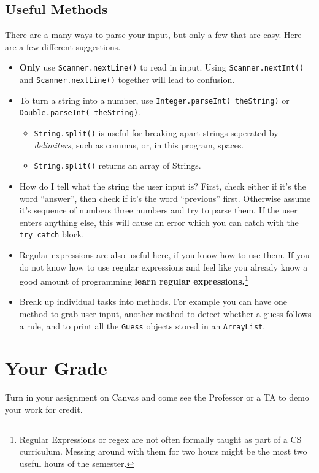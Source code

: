 \documentclass[10pt,letterpaper]{article}
\begin{document}
	\subsection{Useful Methods}
	There are a many ways to parse your input, but only a few that are easy.
	Here are a few different suggestions.  
	\begin{itemize}
		\item \textbf{Only} use \texttt{Scanner.nextLine()} to read in input.  Using \texttt{Scanner.nextInt()} and \texttt{Scanner.nextLine()} together will lead to confusion. 
		\item  To turn a string into a number, use \texttt{Integer.parseInt( theString)} or \texttt{Double.parseInt( theString)}.
		\begin{itemize}	
			\item \texttt{String.split()} is useful for breaking apart strings seperated by \textit{delimiters}, such as commas, or, in this program, spaces.
			\item \texttt{String.split()} returns an array of Strings.
		\end{itemize}
		\item How do I tell what the string the user input is? First, check either if it's the word ``answer'', then check if it's the word ``previous'' first.  Otherwise assume it's sequence of numbers three numbers and try to parse them.  If the user enters anything else, this will cause an error which you can catch with the \texttt{try catch} block. 
		\item Regular expressions are also useful here, if you know how to use them.  If you do not know how to use regular expressions and feel like you already know a good amount of programming \textbf{learn regular expressions.}\footnote{Regular Expressions or regex are not often formally taught as part of a CS curriculum. Messing around with them for two hours might be the most two useful hours of the semester. }
		\item Break up individual  tasks into methods.  For example you can have one method to grab user input, another method to detect whether a guess follows a rule, and to print all the \texttt{Guess} objects stored in an \texttt{ArrayList}.
	\end{itemize}
	
	
	
	
	
	
	\section{Your Grade}
	Turn in your assignment on Canvas and come see the Professor or a TA to demo your work for credit.
	
\end{document}
